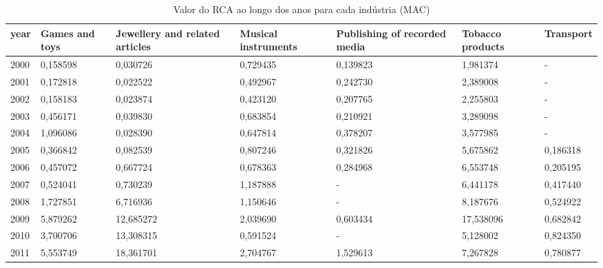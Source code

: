\begin{table}
\centering
\caption{Valor do RCA ao longo dos anos para cada indústria (MAC)}
\begin{tabular}{p{1cm}p{2cm}p{2cm}p{2cm}p{2cm}p{2cm}p{2cm}}
\toprule
 year &  Games and toys &  Jewellery and related articles &  Musical instruments &  Publishing of recorded media &  Tobacco products &  Transport \\
\midrule
 2000 &        0,158598 &                        0,030726 &             0,729435 &                      0,139823 &          1,981374 &          - \\
 2001 &        0,172818 &                        0,022522 &             0,492967 &                      0,242730 &          2,389008 &          - \\
 2002 &        0,158183 &                        0,023874 &             0,423120 &                      0,207765 &          2,255803 &          - \\
 2003 &        0,456171 &                        0,039830 &             0,683854 &                      0,210921 &          3,289098 &          - \\
 2004 &        1,096086 &                        0,028390 &             0,647814 &                      0,378207 &          3,577985 &          - \\
 2005 &        0,366842 &                        0,082539 &             0,807246 &                      0,321826 &          5,675862 &   0,186318 \\
 2006 &        0,457072 &                        0,667724 &             0,678363 &                      0,284968 &          6,553748 &   0,205195 \\
 2007 &        0,524041 &                        0,730239 &             1,187888 &                             - &          6,441178 &   0,417440 \\
 2008 &        1,727851 &                        6,716936 &             1,150646 &                             - &          8,187676 &   0,524922 \\
 2009 &        5,879262 &                       12,685272 &             2,039690 &                      0,603434 &         17,538096 &   0,682842 \\
 2010 &        3,700706 &                       13,308315 &             0,591524 &                             - &          5,128002 &   0,824350 \\
 2011 &        5,553749 &                       18,361701 &             2,704767 &                      1,529613 &          7,267828 &   0,780877 \\

\end{tabular}
\end{table}
